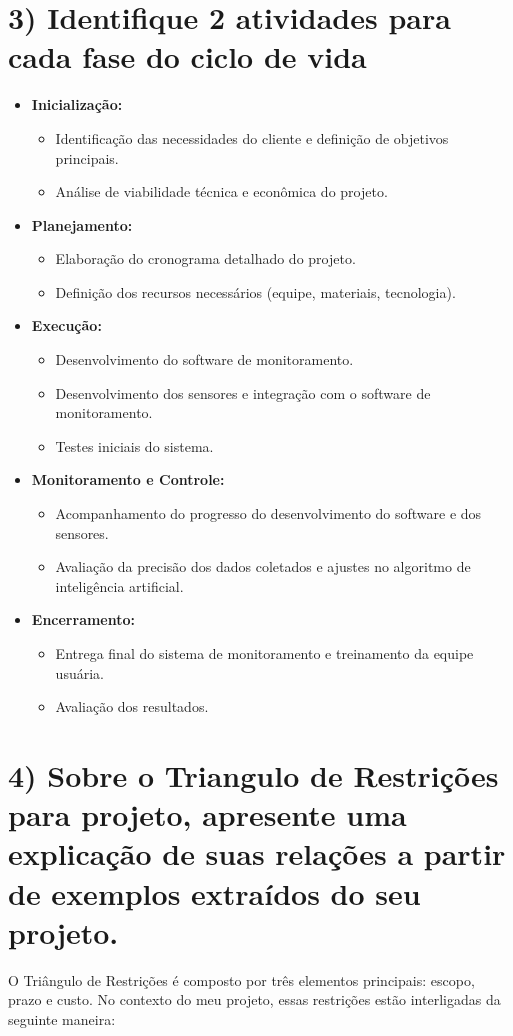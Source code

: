 \documentclass{article}
\begin{document}
	\section*{3) Identifique 2 atividades para cada fase do ciclo de vida}
	\begin{itemize}
		\item \textbf{Inicialização:}
		\begin{itemize}
			\item Identificação das necessidades do cliente e definição de objetivos principais.
			\item Análise de viabilidade técnica e econômica do projeto.
		\end{itemize}
		\item \textbf{Planejamento:}
		\begin{itemize}
			\item Elaboração do cronograma detalhado do projeto.
			\item Definição dos recursos necessários (equipe, materiais, tecnologia).
		\end{itemize}
		\item \textbf{Execução:}
		\begin{itemize}
			\item Desenvolvimento do software de monitoramento.
			\item Desenvolvimento dos sensores e integração com o software de monitoramento.
			\item Testes iniciais do sistema.
		\end{itemize}
		\item \textbf{Monitoramento e Controle:}
		\begin{itemize}
			\item Acompanhamento do progresso do desenvolvimento do software e dos sensores.
			\item Avaliação da precisão dos dados coletados e ajustes no algoritmo de inteligência artificial.
		\end{itemize}
		\item \textbf{Encerramento:}
		\begin{itemize}
			\item Entrega final do sistema de monitoramento e treinamento da equipe usuária.
			\item Avaliação dos resultados.
		\end{itemize}
	\end{itemize}
	
	\section*{4) Sobre o Triangulo de Restrições para projeto, apresente uma	explicação de suas relações a partir de exemplos extraídos do seu projeto.}
	O Triângulo de Restrições é composto por três elementos principais: escopo, prazo e custo. No contexto do meu projeto, essas restrições estão interligadas da seguinte maneira:
	
\end{document}
